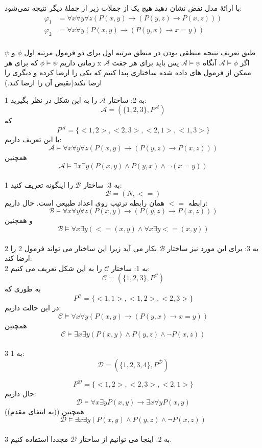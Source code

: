 با ارائهٔ مدل نقض نشان دهید هیچ یک از جملات زیر از جملهٔ دیگر نتیجه نمی‌شود:
\begin{align*}
	\varphi_1 &= \forall x\forall y\forall z(P(x,y)\rightarrow(P(y,z)\rightarrow P(x,z))) \\
	\varphi_2 &= \forall x\forall y(P(x,y)\rightarrow(P(y,x)\rightarrow x=y)) \\
\end{align*}\vspace{-1.5cm}
\begin{ans}
طبق تعریف نتیجه منطقی بودن در منطق مرتبه اول برای دو فرمول مرتبه اول 
	$\phi$
	و
	$\psi$
	زمانی داریم
	$\phi\models\psi$
	که برای هر x 
	$\mathcal{A}$
	اگر 
	$\mathcal{A}\models\phi$
	آنگاه
	$\mathcal{A}\models\psi$
	پس باید برای هر جفت ممکن از فرمول های داده شده ساختاری پیدا کنیم که یکی را ارضا کرده و دیگری را ارضا نکند(نقیض آن را ارضا کند.)
	
	
	
	1 به 2:
	ساختار 
	$\mathcal{A}$
	را به این شکل در نظر بگیرید:
	\[\mathcal{A} = (\{1,2,3\},P^{\mathcal{A}})\]
	که 
	\[P^{\mathcal{A}} = \{<1,2>,<2,3>,<2,1>,<1,3>\}\]
	با این تعریف داریم:
	\[\mathcal{A}\models\forall x\forall y\forall z(P(x,y)\rightarrow(P(y,z)\rightarrow P(x,z)))\]
	همچنین
	\[\mathcal{A}\models\exists x\exists y(P(x,y)\land P(y,x)\land\neg(x=y))\]
	\\
	1 به 3:
	ساختار 
	$\mathcal{B}$
	را اینگونه تعریف کنید:
	\[\mathcal{B} = (N,<=)\]
	رابطه 
	$<=$
	همان رابطه ترتیب روی اعداد طبیعی است. حال داریم:
	\[\mathcal{B}\models\forall x\forall y\forall z(P(x,y)\rightarrow(P(y,z)\rightarrow P(x,z)))\]
	و همچنین 
	\[\mathcal{B}\models\forall x\exists y(<=(x,y)\land\forall x\exists y <=(x,y))\]
	\\
	2 به 3: برای این مورد نیز ساختار 
	$\mathcal{B}$
	بکار می آید زیرا این ساختار می تواند فرمول 2 را ارضا کند.
	\\
	2 به 1: ساختار 
	$\mathcal{C}$
	را به این شکل تعریف می کنیم:
	\[\mathcal{C} = (\{1,2,3\},P^{\mathcal{C}})\]
	به طوری که 
	\[P^{\mathcal{C}} = \{<1,1>, <1,2>, <2,3>\}\]
	در این حالت داریم:
	\[\mathcal{C}\models\forall x\forall y(P(x,y)\rightarrow(P(y,x)\rightarrow x=y))\]
	همچنین 
	\[\mathcal{C}\models\exists x\exists y(P(x,y)\land P(y,z)\land\neg P(x,z))\]
	\\
	3 به 1:
	\[\mathcal{D} = (\{1,2,3,4\},P^{\mathcal{D}})\]
	
	\[P^{\mathcal{D}} = \{<1,2>, <2,3>, <2,1>\}\]
	حال داریم:
	\[\mathcal{D}\models\forall x\exists yP(x,y)\rightarrow\exists x\forall yP(x,y)\]((به انتفای مقدم))
	همچنین
	\[\mathcal{D}\models\exists x\exists y(P(x,y)\land P(y,z)\land\neg P(x,z))\]
	\\
	3 به 2: اینجا می توانیم از ساختار 
	$\mathcal{D}$
	مجددا استفاده کنیم.
\end{ans}
